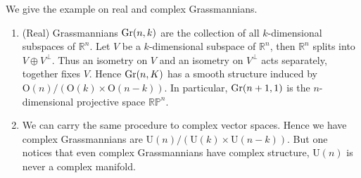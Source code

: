 \begin{eg}
    We give the example on real and complex Grassmannians.
    \begin{enumerate}[(1)]
        \item (Real) Grassmannians $\mathrm{Gr}(n,k)$ are the collection of all $k$-dimensional subspaces of $\mathbb{R}^n$.
        Let $V$ be a $k$-dimensional subspace of $\mathbb{R}^n$, then $\mathbb{R}^n$ splits into $V\oplus V^\perp$.
        Thus an isometry on $V$ and an isometry on $V^\perp$ acts separately, together fixes $V$.
        Hence $\mathrm{Gr}(n,K)$ has a smooth structure induced by $\mathrm{O}(n)/(\mathrm{O}(k)\times\mathrm{O}(n-k))$.
        In particular, $\mathrm{Gr}(n+1,1)$ is the $n$-dimensional projective space $\mathbb{RP}^n$.
        \item We can carry the same procedure to complex vector spaces.
        Hence we have complex Grassmannians are $\mathrm{U}(n)/(\mathrm{U}(k)\times\mathrm{U}(n-k))$.
        But one notices that even complex Grassmannians have complex structure, $\mathrm{U}(n)$ is never a complex manifold.
    \end{enumerate}
\end{eg}